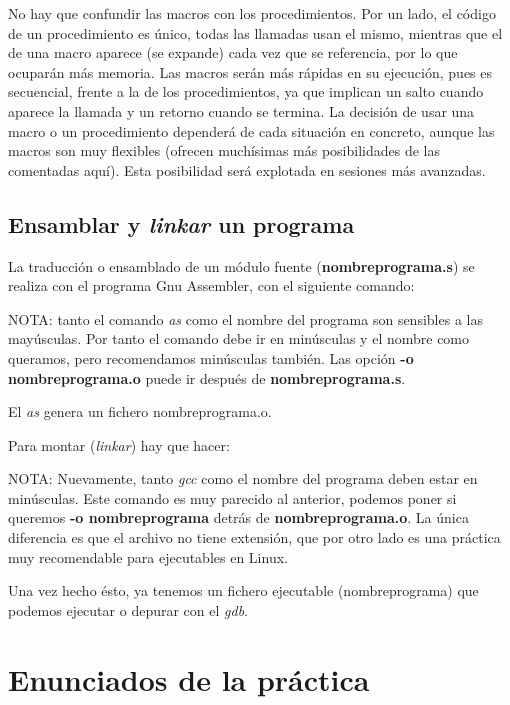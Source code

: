 \begin{itemize}
No hay que confundir las macros con los procedimientos. Por un lado,
el código de un procedimiento es único, todas las llamadas usan el
mismo, mientras que el de una macro aparece (se expande) cada vez que
se referencia, por lo que ocuparán más memoria. Las macros serán
más rápidas en su ejecución, pues es secuencial, frente a la de
los procedimientos, ya que implican un salto cuando aparece la llamada
y un retorno cuando se termina. La decisión de usar una macro o un
procedimiento dependerá de cada situación en concreto, aunque las
macros son muy flexibles (ofrecen muchísimas más posibilidades de las
comentadas aquí). Esta posibilidad será explotada en sesiones más avanzadas.

\end{itemize}

\subsection{Ensamblar y {\it linkar} un programa}

La traducción o ensamblado de un módulo fuente ({\bf nombreprograma.s})
se realiza con el programa Gnu Assembler, con el siguiente comando:

\hspace{2.5cm}{\bf as -o nombreprograma.o nombreprograma.s}

NOTA: tanto el comando {\it as} como el nombre del programa son sensibles
a las mayúsculas. Por tanto el comando debe ir en minúsculas y el nombre
como queramos, pero recomendamos minúsculas también.
Las opción {\bf -o nombreprograma.o} puede ir después de {\bf nombreprograma.s}.

El {\it as} genera un fichero nombreprograma.o.

Para montar ({\it linkar}) hay que hacer:

\hspace{2.5cm}{\bf gcc -o nombreprograma nombreprograma.o}

NOTA: Nuevamente, tanto {\it gcc} como el nombre del programa deben estar
en minúsculas. Este comando es muy parecido al anterior, podemos poner si
queremos {\bf -o nombreprograma} detrás de {\bf nombreprograma.o}. La única
diferencia es que el archivo no tiene extensión, que por otro lado es una
práctica muy recomendable para ejecutables en Linux.

Una vez hecho ésto, ya tenemos un fichero ejecutable (nombreprograma) que
podemos ejecutar o depurar con el {\it gdb}.

\section{Enunciados de la práctica}

